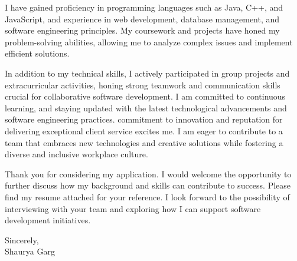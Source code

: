 \documentclass[11pt,a4]{article}
\begin{document}
I have gained proficiency in programming languages such as Java, C++, and JavaScript, and experience in web development, database management, and software engineering principles. My coursework and projects have honed my problem-solving abilities, allowing me to analyze complex issues and implement efficient solutions. \par

In addition to my technical skills, I actively participated in group projects and extracurricular activities, honing strong teamwork and communication skills crucial for collaborative software development. I am committed to continuous learning, and staying updated with the latest technological advancements and software engineering practices. \companys commitment to innovation and reputation for delivering exceptional client service excites me. I am eager to contribute to a team that embraces new technologies and creative solutions while fostering a diverse and inclusive workplace culture.\par

Thank you for considering my application. I would welcome the opportunity to further discuss how my background and skills can contribute to \companys success. Please find my resume attached for your reference. I look forward to the possibility of interviewing with your team and exploring how I can support \companys software development initiatives.


\vspace{0.5cm}
\raggedright
Sincerely, \\ Shaurya Garg 
\end{document}
